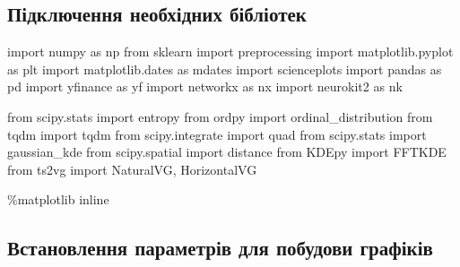 \documentclass[
  letterpaper,
]{report}
\newenvironment{Shaded}{\begin{snugshade}}{\end{snugshade}}
\newcommand{\ImportTok}[1]{\textcolor[rgb]{0.00,0.46,0.62}{#1}}
\newcommand{\NormalTok}[1]{\textcolor[rgb]{0.00,0.23,0.31}{#1}}
\newcommand{\OperatorTok}[1]{\textcolor[rgb]{0.37,0.37,0.37}{#1}}
\begin{document}
\hypertarget{ux43fux456ux434ux43aux43bux44eux447ux435ux43dux43dux44f-ux43dux435ux43eux431ux445ux456ux434ux43dux438ux445-ux431ux456ux431ux43bux456ux43eux442ux435ux43a}{%
\subsection{Підключення необхідних
бібліотек}\label{ux43fux456ux434ux43aux43bux44eux447ux435ux43dux43dux44f-ux43dux435ux43eux431ux445ux456ux434ux43dux438ux445-ux431ux456ux431ux43bux456ux43eux442ux435ux43a}}

\begin{Shaded}
\begin{Highlighting}[]
\ImportTok{import}\NormalTok{ numpy }\ImportTok{as}\NormalTok{ np}
\ImportTok{from}\NormalTok{ sklearn }\ImportTok{import}\NormalTok{ preprocessing}
\ImportTok{import}\NormalTok{ matplotlib.pyplot }\ImportTok{as}\NormalTok{ plt}
\ImportTok{import}\NormalTok{ matplotlib.dates }\ImportTok{as}\NormalTok{ mdates}
\ImportTok{import}\NormalTok{ scienceplots}
\ImportTok{import}\NormalTok{ pandas }\ImportTok{as}\NormalTok{ pd}
\ImportTok{import}\NormalTok{ yfinance }\ImportTok{as}\NormalTok{ yf}
\ImportTok{import}\NormalTok{ networkx }\ImportTok{as}\NormalTok{ nx}
\ImportTok{import}\NormalTok{ neurokit2 }\ImportTok{as}\NormalTok{ nk}

\ImportTok{from}\NormalTok{ scipy.stats }\ImportTok{import}\NormalTok{ entropy}
\ImportTok{from}\NormalTok{ ordpy }\ImportTok{import}\NormalTok{ ordinal\_distribution}
\ImportTok{from}\NormalTok{ tqdm }\ImportTok{import}\NormalTok{ tqdm}
\ImportTok{from}\NormalTok{ scipy.integrate }\ImportTok{import}\NormalTok{ quad}
\ImportTok{from}\NormalTok{ scipy.stats }\ImportTok{import}\NormalTok{ gaussian\_kde}
\ImportTok{from}\NormalTok{ scipy.spatial }\ImportTok{import}\NormalTok{ distance}
\ImportTok{from}\NormalTok{ KDEpy }\ImportTok{import}\NormalTok{ FFTKDE}
\ImportTok{from}\NormalTok{ ts2vg }\ImportTok{import}\NormalTok{ NaturalVG, HorizontalVG}

\OperatorTok{\%}\NormalTok{matplotlib inline}
\end{Highlighting}
\end{Shaded}

\hypertarget{ux432ux441ux442ux430ux43dux43eux432ux43bux435ux43dux43dux44f-ux43fux430ux440ux430ux43cux435ux442ux440ux456ux432-ux434ux43bux44f-ux43fux43eux431ux443ux434ux43eux432ux438-ux433ux440ux430ux444ux456ux43aux456ux432}{%
\subsection{Встановлення параметрів для побудови
графіків}\label{ux432ux441ux442ux430ux43dux43eux432ux43bux435ux43dux43dux44f-ux43fux430ux440ux430ux43cux435ux442ux440ux456ux432-ux434ux43bux44f-ux43fux43eux431ux443ux434ux43eux432ux438-ux433ux440ux430ux444ux456ux43aux456ux432}}
\end{document}
